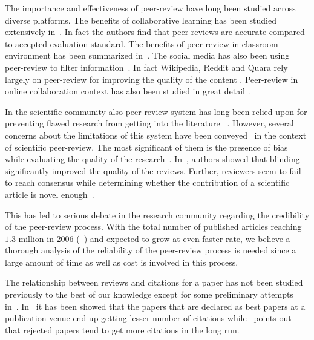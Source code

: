 The importance and effectiveness of peer-review have long been studied across diverse platforms. The benefits of collaborative learning has been studied extensively in~\cite{reily2009two}. In fact the authors find that peer reviews are accurate compared to accepted evaluation standard. The benefits of peer-review in classroom environment has been summarized in~\cite{hamer2005method}. The social media has also been using peer-review to filter information~\cite{diakopoulos2011towards,lampe2004slash}.  
In fact Wikipedia, Reddit and Quara rely largely on peer-review for improving the quality of the content \cite{stvilia2008information}. Peer-review in online collaboration context has also been studied in great detail \cite{brindley2009creating, huang2016effectiveness}.  %

In the scientific community also peer-review system has long been relied upon for preventing flawed research from getting into the literature ~\cite{kassirer1994peer}. However, several concerns about the limitations of this system have been conveyed~\cite{ingelfinger1974peer,relman1989good,smith2006peer} in the context of scientific peer-review. The most significant of them is the presence of bias while evaluating the quality of the research~\cite{lee2013bias}.  In~\cite{mcnutt1990effects}, authors showed that blinding significantly improved the quality of the reviews. Further, reviewers seem to fail to reach consensus while determining whether the contribution of a scientific article is novel enough~\cite{cole1981chance}. 

This has led to serious debate in the research community regarding the credibility of the peer-review process. With the total number of published articles reaching $1.3$ million in 2006 (~\cite{bjork2009scientific}) and expected to grow at even faster rate, we believe a thorough analysis of the reliability of the peer-review process is needed since a large amount of time as well as cost is involved in this process. 


The relationship between reviews and citations for a paper has not been studied previously to the best of our knowledge except for some preliminary attempts in~\cite{braatz2014papers, coupe2013peer}.
In~\cite{coupe2013peer} it has been showed that the papers that are declared as best papers at a publication venue end up getting lesser number of citations while~\cite{braatz2014papers} points out that rejected papers tend to get more citations in the long run. 


